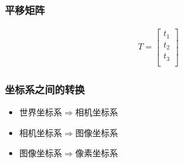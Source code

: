 \documentclass[aspectratio=43]{beamer}
\begin{document}
\begin{frame}
	\frametitle{平移矩阵}
	\begin{gather}
		T=\left[ \begin{array}{c}
			t_1\\
			t_2\\
			t_3\\
		\end{array} \right] 
	\end{gather}	
\end{frame}

\begin{frame}
	\frametitle{坐标系之间的转换}
	\begin{itemize}
		\item 世界坐标系$\Longrightarrow$相机坐标系
		\item 相机坐标系$\Longrightarrow$图像坐标系
		\item 图像坐标系$\Longrightarrow$像素坐标系
	\end{itemize}
\end{frame}
\end{document}
